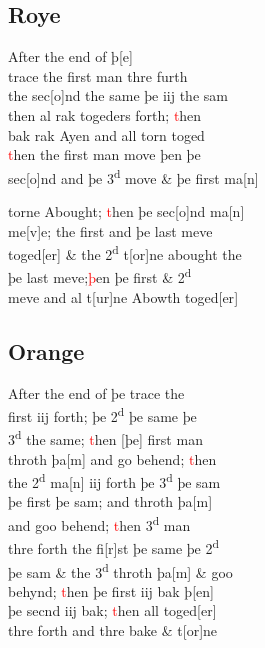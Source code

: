 \documentclass[12pt,letter]{article} %
\newcommand{\red}[1]{\textcolor{red}{#1}}
\newcommand{\srcpg}[1]{
    \noindent{
        \color{Gray}{\rule[0.5ex]{\linewidth}{1pt}~#1} 
    
    }
}
\begin{document}
\subsection{Roye}
After the end of þ{[}e{]}\\
trace the first man thre furth\\
the sec{[}o{]}nd the  same þe iij the sam\\
then al rak togeders forth; \red{t}hen\\
bak rak Ayen and all torn toged\\
\red{t}hen the first man move þen þe\\
sec{[}o{]}nd and þe 3\textsuperscript{d} move \& þe first ma{[}n{]} 
\srcpg{66}
 torne Abought; \red{t}hen þe sec{[}o{]}nd ma{[}n{]}\\
me{[}v{]}e; the first and þe last meve\\
toged{[}er{]} \& the 2\textsuperscript{d} t{[}or{]}ne abought the\\
þe last meve;\red{þ}en þe first \& 2\textsuperscript{d}\\
meve and al t{[}ur{]}ne Abowth toged{[}er{]}

\subsection{Orange}
After the end of þe trace the\\
first iij forth; þe 2\textsuperscript{d} þe same þe\\
3\textsuperscript{d} the same; \red{t}hen {[}þe{]} first man\\
throth þa{[}m{]} and go behend; \red{t}hen\\
the 2\textsuperscript{d} ma{[}n{]} iij forth þe 3\textsuperscript{d} þe sam\\
þe first þe sam; and throth þa{[}m{]}\\
and goo behend; \red{t}hen 3\textsuperscript{d} man\\
thre forth the  fi{[}r{]}st þe same þe 2\textsuperscript{d}\\
þe sam \& the 3\textsuperscript{d} throth þa{[}m{]} \& goo\\
behynd; \red{t}hen þe first iij bak þ{[}en{]}\\
þe secnd iij bak; \red{t}hen all toged{[}er{]}\\
thre forth and thre bake \& t{[}or{]}ne
\end{document}
